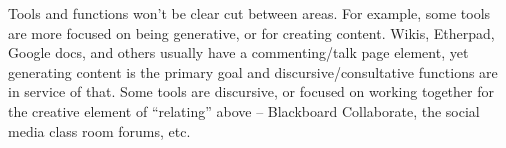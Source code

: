 
Tools and functions won't be clear cut between areas. For example, some
tools are more focused on being generative, or for creating content.
Wikis, Etherpad, Google docs, and others usually have a commenting/talk
page element, yet generating content is the primary goal and
discursive/consultative functions are in service of that. Some tools are
discursive, or focused on working together for the creative element of
``relating'' above -- Blackboard Collaborate, the social media class
room forums, etc.

